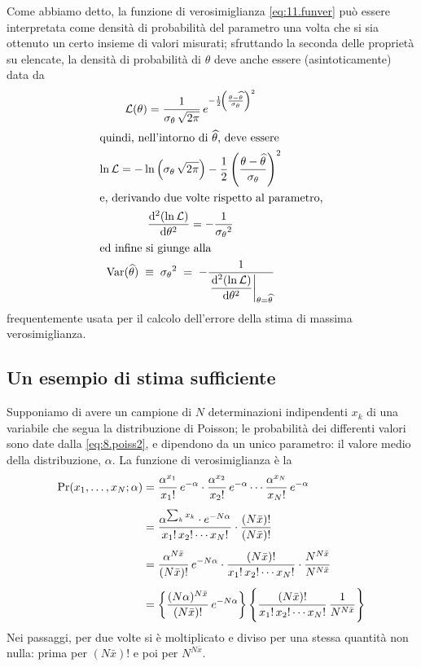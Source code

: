 Come abbiamo detto, la funzione di verosimiglianza
\eqref{eq:11.funver} pu\`o essere interpretata come
densit\`a di probabilit\`a del parametro una volta che si
sia ottenuto un certo insieme di valori misurati; sfruttando
la seconda delle propriet\`a su elencate, la densit\`a di
probabilit\`a di $\theta$ deve anche essere
(asintoticamente) data da
\begin{gather}
  \mathcal{L} (\theta) = \frac{1}{\sigma_\theta \, \sqrt{2
    \pi}} \, e^{- \frac{1}{2} \! \left(
    \frac{\theta - \widehat \theta}{\sigma_\theta} \right)^2}
    \notag \\
  \intertext{quindi, nell'intorno di $\widehat \theta$, deve
    essere}
  \ln \mathcal{L} = -\ln \left( \sigma_\theta \, \sqrt{2
    \pi} \right) - \frac{1}{2} \left( \frac{\theta - \widehat
    \theta}{\sigma_\theta} \right)^2 \notag \\
  \intertext{e, derivando due volte rispetto al parametro,}
  \frac{\mathrm{d}^2 ( \ln \mathcal{L} ) }{\mathrm{d} \theta^2} = -
    \frac{1}{{\sigma_\theta}^2} \notag \\
  \intertext{ed infine si giunge alla}
  \operatorname{Var}( \widehat \theta ) \; \equiv \; {\sigma_\theta}^2
    \; = \; - \frac{1}{\displaystyle \left. \frac{\mathrm{d}^2 (
    \ln \mathcal{L} ) }{\mathrm{d} \theta^2} \right|_{\theta = \widehat
    \theta}} \label{eq:11.varlik}
\end{gather}
frequentemente usata per il calcolo dell'errore della stima
di massima verosimiglianza.

\subsection{Un esempio di stima sufficiente}%
%
\label{ch:11.stisuf}
Supponiamo di avere un campione di $N$ determinazioni
indipendenti $x_k$ di una variabile che segua la
distribuzione di Poisson; le probabilit\`a dei differenti
valori sono date dalla \eqref{eq:8.poiss2}, e dipendono da
un unico parametro: il valore medio della distribuzione,
$\alpha$.  La funzione di verosimiglianza \`e la
\begin{align}
  \Pr(x_1, \ldots, x_N; \alpha) &=
  \frac{ \alpha^{x_1} }{ x_1 ! } \, e^{- \alpha} \cdot
  \frac{ \alpha^{x_2} }{ x_2 ! } \, e^{- \alpha} \cdots
  \frac{ \alpha^{x_N} }{ x_N ! } \, e^{- \alpha} \notag
  \\[1ex]
  &= \frac{ \alpha^{\sum_k x_k} \cdot e^{- N \alpha} }{ x_1!
    \, x_2! \cdots x_N!} \cdot \frac{ (N \bar x)! }{ (N \bar
    x)! } \notag \\[1ex]
  &= \frac{ \alpha^{ N \bar x } }{ ( N \bar x )! } \, e^{- N
    \alpha} \cdot \frac{ ( N \bar x )! }{ x_1! \, x_2!
    \cdots x_N! } \cdot \frac{ N^{N \bar x} }{ N^{N \bar x}
    } \notag \\[1ex]
  &= \left\{ \frac{ (N \alpha)^{N \bar x} }{ (N \bar x)! }
    \, e^{-N \alpha} \right\} \Biggl\{ \frac{ (N \bar x)! }{
      x_1! \, x_2! \cdots x_N! } \, \frac{ 1 }{ N^{N \bar x}
      } \Biggr\} \label{eq:11.stisuf}
\end{align}
Nei passaggi, per due volte si \`e moltiplicato e diviso per
una stessa quantit\`a non nulla: prima per $(N \bar x)!$ e
poi per $N^{N \bar x}$.


